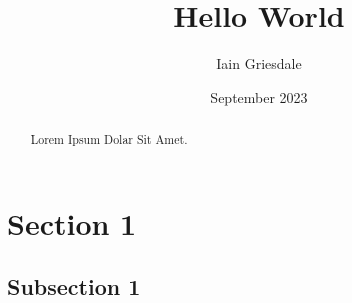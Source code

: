 \documentclass[titlepage]{article}
\title{Hello World}
\author{Iain Griesdale}
\date{September 2023}
\begin{document}
\maketitle

\begin{abstract}
    Lorem Ipsum Dolar Sit Amet.
\end{abstract}

\section{Section 1}

\subsection{Subsection 1}
\end{document}
